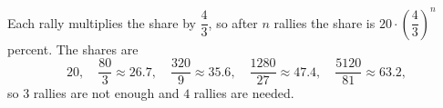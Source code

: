 Each rally multiplies the share by $\dfrac43$, so after $n$ rallies the share is $20\cdot\left(\dfrac43\right)^n$ percent. The shares are
\[20,\quad\dfrac{80}{3}\approx26.7,\quad\dfrac{320}{9}\approx35.6,\quad\dfrac{1280}{27}\approx47.4,\quad\dfrac{5120}{81}\approx63.2,\]
so $3$ rallies are not enough and $\boxed{4}$ rallies are needed.
